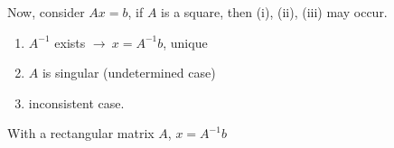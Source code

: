 \vspace{1em}

Now, consider $Ax = b$, if $A$ is a square, then (i), (ii), (iii) may occur.

\begin{enumerate}[label=(\roman*)]
    \item $A^{-1}$ exists $\longrightarrow \ x = A^{-1} b$, unique
    \item $A$ is singular (undetermined case)
    \item inconsistent case.
\end{enumerate}

\noindent\hrulefill

\vspace{1em}

With a rectangular matrix $A$, $x = A^{-1}b $ 

\newpage

